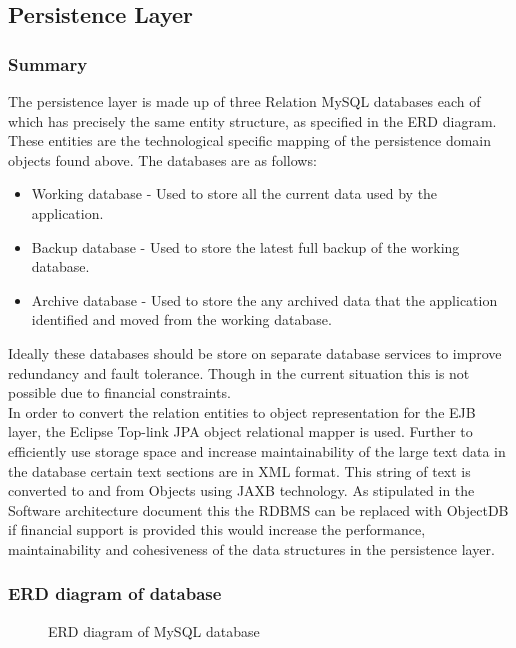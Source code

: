 \documentclass[12pt]{article}
\begin{document}
\newpage
\subsection{Persistence Layer}
\subsubsection{Summary}
The persistence layer is made up of three Relation MySQL databases each of which has precisely the same entity structure, as specified in the ERD diagram. These entities are the technological specific mapping of the persistence domain objects found above. The databases are as follows:
\begin{itemize}
	\item Working database - Used to store all the current data used by the application.
	\item Backup database - Used to store the latest full backup of the working database.
	\item Archive database - Used to store the any archived data that the application identified and moved from the working database. 
\end{itemize}

Ideally these databases should be store on separate database services to improve redundancy and fault tolerance. Though in the current situation this is not possible due to financial constraints.\\
In order to convert the relation entities to object representation for the EJB layer, the Eclipse Top-link JPA object relational mapper is used. Further to efficiently use storage space and increase maintainability of the large text data in the database certain text sections are in XML format. This string of text is converted to and from Objects using JAXB technology.  
As stipulated in the Software architecture document this the RDBMS can be replaced with ObjectDB if financial support is provided this would increase the performance, maintainability and cohesiveness of the data structures in the persistence layer.
\newpage
\subsubsection{ERD diagram of database}
\begin{figure}[H]
\centering	
{}
\caption{ERD diagram of MySQL database}
\end{figure}
\end{document}
